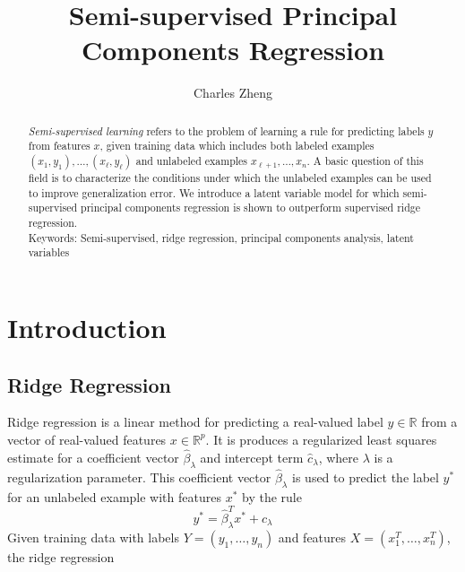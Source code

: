 \documentclass[11pt]{article}
\begin{document}
\newcommand{\tr}{\text{tr}}
\newcommand{\E}{\textbf{E}}
\newcommand{\diag}{\text{diag}}
\newcommand{\argmax}{\text{argmax}}
\newcommand{\argmin}{\text{argmin}}
\newcommand{\Cov}{\text{Cov}}
\newcommand{\Vol}{\text{Vol}}
\pagestyle{fancy}

\title{Semi-supervised Principal Components Regression}

\author{Charles Zheng}

\maketitle

\begin{abstract}
\emph{Semi-supervised learning} refers to the problem of learning a
rule for predicting labels $y$ from features $x$, given training data
which includes both labeled examples $(x_1, y_1), \hdots, (x_\ell,
y_\ell)$ and unlabeled examples $x_{\ell + 1}, \hdots, x_n$.  A basic
question of this field is to characterize the conditions under which
the unlabeled examples can be used to improve generalization error.
We introduce a latent variable model for which semi-supervised
principal components regression is shown to outperform supervised
ridge regression.\\

Keywords: Semi-supervised, ridge regression,
principal components analysis, latent variables
\end{abstract}

\section{Introduction}

\subsection{Ridge Regression}

Ridge regression is a linear method for predicting a real-valued label
$y \in \mathbb{R}$ from a vector of real-valued features $x \in
\mathbb{R}^p$.  It is produces a regularized least squares estimate
for a coefficient vector $\hat{\beta}_\lambda$ and intercept term
$\hat{c}_\lambda$, where $\lambda$ is a regularization parameter.
This coefficient vector $\hat{\beta}_\lambda$ is used to predict the
label $y^*$ for an unlabeled example with features $x^*$ by the rule
\[
y^* = \hat{\beta}_\lambda^T x^* + \hat{c}_\lambda
\]
Given training data
with labels $Y = (y_1,\hdots, y_n)$ and features $X = (x_1^T,\hdots,
x_n^T)$, the ridge regression 
\end{document}
